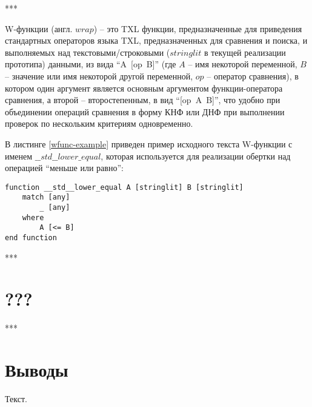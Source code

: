 ***

W-функции (англ. $wrap$) -- это TXL функции, предназначенные для приведения стандартных операторов языка TXL, предназначенных для сравнения и поиска, и выполняемых над текстовыми/строковыми ($stringlit$ в текущей реализации прототипа) данными, из вида ``A~[op~B]'' (где $A$ -- имя некоторой переменной, $B$ -- значение или имя некоторой другой переменной, $op$ -- оператор сравнения), в котором один аргумент является основным аргументом функции-оператора сравнения, а второй -- второстепенным, в вид ``[op~A~B]'', что удобно при объединении операций сравнения в форму КНФ или ДНФ при выполнении проверок по нескольким критериям одновременно.

В листинге \ref{wfunc-example} приведен пример исходного текста W-функции с именем $\_\_std\_\_lower\_equal$, которая используется для реализации обертки над операцией ``меньше или равно'':

\begin{lstlisting}[frame=single, language=TXL, label={wfunc-example}, caption={Пример W-функции}]
function __std__lower_equal A [stringlit] B [stringlit]
	match [any]
		_ [any]
	where
		A [<= B]
end function
\end{lstlisting}

***

\section{???}

***

\section{Выводы}

Текст.
